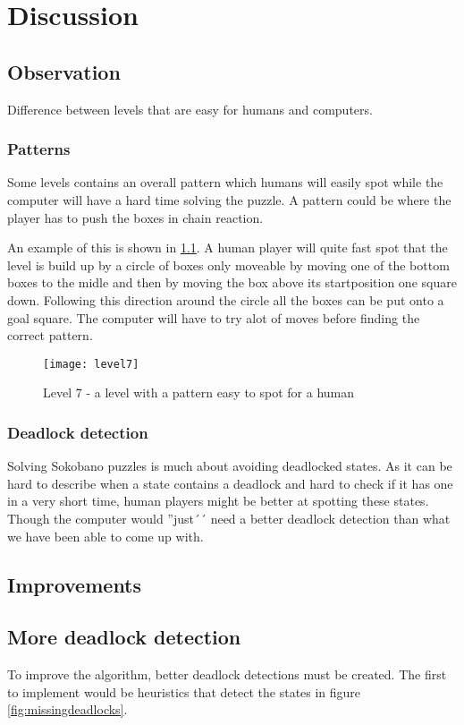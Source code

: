 
\chapter{Discussion}
\label{cha:discussion}

\section{Observation}
Difference between levels that are easy for humans and computers.

\subsection{Patterns}
Some levels contains an overall pattern which humans will easily spot while the computer will have a hard time solving the puzzle. A pattern could be where the player has to push the boxes in chain reaction.

An example of this is shown in \ref{fig:level7}. A human player will quite fast spot that the level is build up by a circle of boxes only moveable by moving one of the bottom boxes to the midle and then by moving the box above its startposition one square down. Following this direction around the circle all the boxes can be put onto a goal square. The computer will have to try alot of moves before finding the correct pattern.

\begin{figure}[htp]
	\centering
	\texttt{[image: level7]}
	\caption{Level 7 - a level with a pattern easy to spot for a human}
	\label{fig:level7}
\end{figure}

\subsection{Deadlock detection}
Solving Sokobano puzzles is much about avoiding deadlocked states. As it can be hard to describe when a state contains a deadlock and hard to check if it has one in a very short time, human players might be better at spotting these states. Though the computer would ''just´´ need a better deadlock detection than what we have been able to come up with.

\section{Improvements}
\section{More deadlock detection}
To improve the algorithm, better deadlock detections must be
created. The first to implement would be heuristics that detect the
states in figure \ref{fig:missingdeadlocks}.


